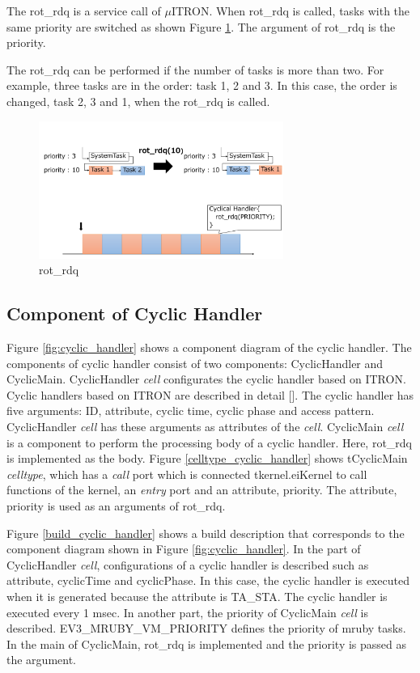 \documentclass[conference,compsoc]{IEEEtran}
\begin{document}
The rot\_rdq is a service call of $\mu$ITRON.
When rot\_rdq is called, tasks with the same priority are switched as shown Figure \ref{fig:rot_rdq}.
The argument of rot\_rdq is the priority.


The rot\_rdq can be performed if the number of tasks is more than two.
For example, three tasks are in the order: task 1, 2 and 3.
In this case, the order is changed, task 2, 3 and 1, when the rot\_rdq is called.

\begin{figure}[t]
    \centering
    \includegraphics[width=8cm,clip]{figure/rot_rdq.pdf}
    \caption{rot\_rdq}
    \label{fig:rot_rdq}
\end{figure}

\subsection{Component of Cyclic Handler}
Figure \ref{fig:cyclic_handler} shows a component diagram of the cyclic handler.
The components of cyclic handler consist of two components: CyclicHandler and CyclicMain.
CyclicHandler {\it cell} configurates the cyclic handler based on ITRON.
Cyclic handlers based on ITRON are described in detail [].
The cyclic handler has five arguments: ID, attribute, cyclic time, cyclic phase and access pattern.
CyclicHandler {\it cell} has these arguments as attributes of the {\it cell}.
CyclicMain {\it cell} is a component to perform the processing body of a cyclic handler.
Here, rot\_rdq is implemented as the body.
Figure \ref{celltype_cyclic_handler} shows tCyclicMain {\it celltype}, which has a {\it call} port which is connected tkernel.eiKernel to call functions of the kernel, an {\it entry} port and an attribute, priority.
The attribute, priority is used as an arguments of rot\_rdq.

Figure \ref{build_cyclic_handler} shows a build description that corresponds to the component diagram shown in Figure \ref{fig:cyclic_handler}.
In the part of CyclicHandler {\it cell}, configurations of a cyclic handler is described such as attribute, cyclicTime and cyclicPhase.
In this case, the cyclic handler is executed when it is generated because the attribute is TA\_STA.
The cyclic handler is executed every 1 msec.
In another part, the priority of CyclicMain {\it cell} is described.
EV3\_MRUBY\_VM\_PRIORITY defines the priority of mruby tasks.
In the main of CyclicMain, rot\_rdq is implemented and the priority is passed as the argument.
\end{document}
